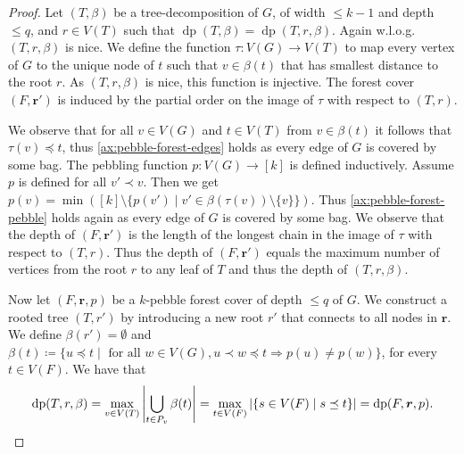 \documentclass{lmcs}
\theoremstyle{plain}\newtheorem{claim}[thm]{Claim}   %
\DeclareMathOperator{\dep}{dp}
\renewcommand{\vec}[1]{\ensuremath{\boldsymbol{#1}}}
\begin{document}
\begin{proof}
	Let $(T,\beta)$ be a tree-decomposition of $G$, of width $\leq k-1$ and depth $\leq q$, and $r\in V(T)$ such that $\dep(T,\beta) = \dep(T,r,\beta)$.
	Again w.l.o.g.\ $(T,r,\beta)$ is nice.
	We define the function $\tau\colon V(G) \rightarrow V(T)$ to map every vertex of $G$ to the unique node of $t$ such that $v\in\beta(t)$ that has smallest distance to the root $r$.
	As $(T,r,\beta)$ is nice, this function is injective.
	The forest cover $(F,\vec{r}')$ is induced by the partial order on the image of $\tau$ with respect to $(T,r)$.
	
	We observe that for all $v\in V(G)$ and $t\in V(T)$ from $v\in\beta(t)$ it follows that $\tau(v)\preceq t$, thus \autoref{ax:pebble-forest-edges} holds as every edge of $G$ is covered by some bag.
	The pebbling function $p\colon V(G) \rightarrow [k]$ is defined inductively.
	Assume $p$ is defined for all $v'\prec v$.
	Then we get $p(v)= \min ([k] \setminus \{ p(v')\mid v'\in \beta(\tau(v))\setminus\{v\}\})$.
	Thus \autoref{ax:pebble-forest-pebble} holds again as every edge of $G$ is covered by some bag.
	We observe that the depth of $(F,\vec{r}')$ is the length of the longest chain in the image of $\tau$ with respect to $(T,r)$.
	Thus the depth of $(F,\vec{r}')$ equals the maximum number of vertices from the root $r$ to any leaf of $T$ and thus the depth of $(T,r,\beta)$.
	
	Now let $(F, \vec{r},p)$ be a $k$-pebble forest cover of depth $\leq q$ of $G$.
	We construct a rooted tree $(T,r')$ by introducing a new root $r'$ that connects to all nodes in $\vec{r}$.
	We define $\beta(r')=\emptyset$ and $\beta(t)\coloneqq \{u\preceq t\mid \text{ for all } w\in V(G), u\prec w\preceq t \Rightarrow p(u)\neq p(w) \}$, for every $t\in V(F)$.
	We have that \[\dep(T,r,\beta)= \max_{v \in V(T)} \left| \bigcup_{t\in P_v} \beta(t) \right| = \max_{t\in V(F)}|\{s\in V(F)\mid s\preceq t \}|=\dep(F,\vec{r},p).\qedhere\]
\end{proof}
\end{document}
